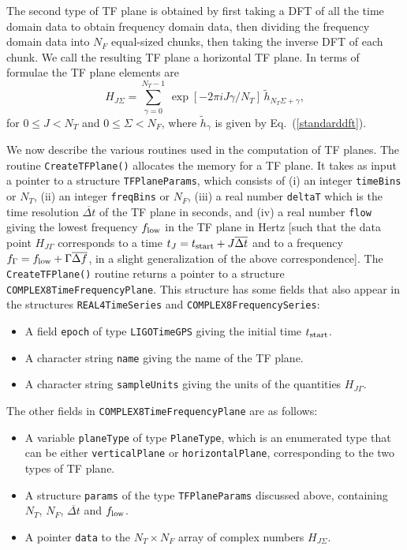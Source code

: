 \documentclass{article}
\begin{document}
The second type of TF plane is obtained by first taking a DFT of all
the time domain data to obtain frequency domain data, then dividing
the frequency domain data into $N_F$ equal-sized chunks, then taking
the inverse DFT of each chunk.  We call the resulting TF plane a
horizontal TF plane. In terms of formulae the TF plane elements are
\begin{equation}
H_{J\Sigma} = \sum_{\gamma=0}^{N_T-1} \, \exp \left[ -2 \pi i J \gamma
/ N_T \right] \, {\tilde h}_{N_T \Sigma + \gamma},
\label{horizontalTFP}
\end{equation}
for $0 \le J < N_T$ and $0 \le \Sigma < N_F$, where ${\tilde
h}_\gamma$ is given by Eq.\ (\ref{standarddft}).

We now describe the various routines used in the computation of TF planes.
The routine \verb+CreateTFPlane()+ allocates the memory for a TF plane.
It takes as input a pointer to a structure \verb+TFPlaneParams+, which
consists of (i) an integer \verb+timeBins+ or $N_T$, (ii) an integer
\verb+freqBins+ or $N_F$, (iii) a real number \verb+deltaT+ which is
the time resolution ${\overline {\Delta t}}$ of the TF plane in seconds, and 
(iv) a real number \verb+flow+ giving the lowest frequency $f_{\rm
low}$ in the TF plane in Hertz [such that the data point $H_{J\Gamma}$
corresponds to a time $t_J = t_{\rm start} + J {\overline {\Delta t}}$
and to a frequency 
$f_\Gamma = f_{\rm low} + \Gamma {\overline {\Delta f}}$, in a slight
generalization of the above correspondence].  The 
\verb+CreateTFPlane()+ routine returns a
pointer to a structure \verb+COMPLEX8TimeFrequencyPlane+.  This
structure has some fields that also appear in the structures
\verb+REAL4TimeSeries+ and \verb+COMPLEX8FrequencySeries+:
\begin{itemize}
\item A field \verb+epoch+ of type \verb+LIGOTimeGPS+ giving the initial
time $t_{\rm start}$.
\item A character string \verb+name+ giving the
name of the TF plane.
\item A character string \verb+sampleUnits+
giving the units of the quantities $H_{J\Gamma}$.
\end{itemize}
The other fields in \verb+COMPLEX8TimeFrequencyPlane+ are as follows:
\begin{itemize}
\item A variable \verb+planeType+ of type \verb+PlaneType+, which is
an enumerated type that can be either \verb+verticalPlane+ or
\verb+horizontalPlane+, corresponding to the two types of TF plane. 
\item A structure \verb+params+ of the type \verb+TFPlaneParams+
discussed above, containing $N_T$, $N_F$, ${\overline {\Delta t}}$ and
$f_{\rm low}$.
\item A pointer \verb+data+ to the $N_T \times N_F$ array of complex
numbers $H_{J\Sigma}$.
\end{itemize}
  
\end{document}
